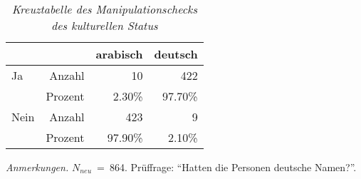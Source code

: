 \begin{table}[htb]
    \caption[Kreuztabelle Manipulationscheck kultureller Status]{\textit {Kreuztabelle des Manipulationschecks des kulturellen Status}} 
    \label{KT_kult}
    \centering
    \begin{adjustbox}{width=6.5cm} %
    \small
    \begin{tabular}{lrrr}
      \hline
        &   & arabisch & deutsch \\
      \hline
    Ja   & Anzahl  & 10      & 422      \\
         & Prozent & 2.30\%  & 97.70\%  \\
    Nein & Anzahl  & 423     & 9        \\
         & Prozent & 97.90\% & 2.10\%   \\
       \hline
    \end{tabular}
    \end{adjustbox}
    
    \begin{tablenotes}
        \item \textit{Anmerkungen.} \( N_{neu} \)~=~864. Prüffrage: \enquote{Hatten die Personen deutsche Namen?}.
      \end{tablenotes}
    \end{table}